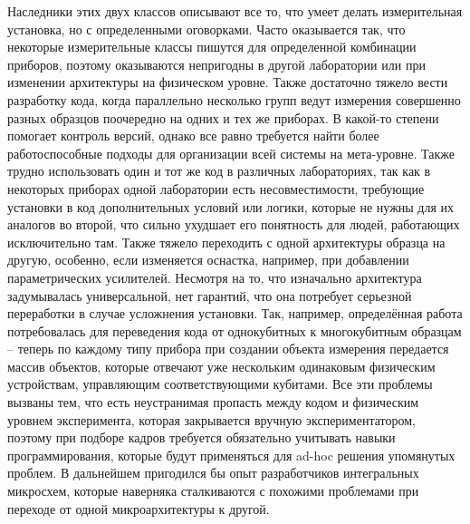 \documentclass[14pt, a4paper]{extreport}
\numberwithin{equation}{section}
\begin{document}
Наследники этих двух классов описывают все то, что умеет делать измерительная установка, но с определенными оговорками. Часто оказывается так, что некоторые измерительные классы пишутся для определенной комбинации приборов, поэтому оказываются непригодны в другой лаборатории или при изменении архитектуры на физическом уровне. Также достаточно тяжело вести разработку кода, когда параллельно несколько групп ведут измерения совершенно разных образцов поочередно на одних и тех же приборах. В какой-то степени помогает контроль версий, однако все равно требуется найти более работоспособные подходы для организации всей системы на мета-уровне. Также трудно использовать один и тот же код в различных лабораториях, так как в некоторых приборах одной лаборатории есть несовместимости, требующие установки в код дополнительных условий или логики, которые не нужны для их аналогов во второй, что сильно ухудшает его понятность для людей, работающих исключительно там. Также тяжело переходить с одной архитектуры образца на другую, особенно, если изменяется оснастка, например, при добавлении параметрических усилителей. Несмотря на то, что изначально архитектура задумывалась универсальной, нет гарантий, что она потребует серьезной переработки в случае усложнения установки. Так, например, определённая работа потребовалась для переведения кода от однокубитных к многокубитным образцам -- теперь по каждому типу прибора при создании объекта измерения передается массив объектов, которые отвечают уже нескольким одинаковым физическим устройствам, управляющим соответствующими кубитами. Все эти проблемы вызваны тем, что есть неустранимая пропасть между кодом и физическим уровнем эксперимента, которая закрывается вручную экспериментатором, поэтому при подборе кадров требуется обязательно учитывать навыки программирования, которые будут применяться для ad-hoc решения упомянутых проблем. В дальнейшем пригодился бы опыт разработчиков интегральных микросхем, которые наверняка сталкиваются с похожими проблемами при переходе от одной микроархитектуры к другой.
\end{document}
